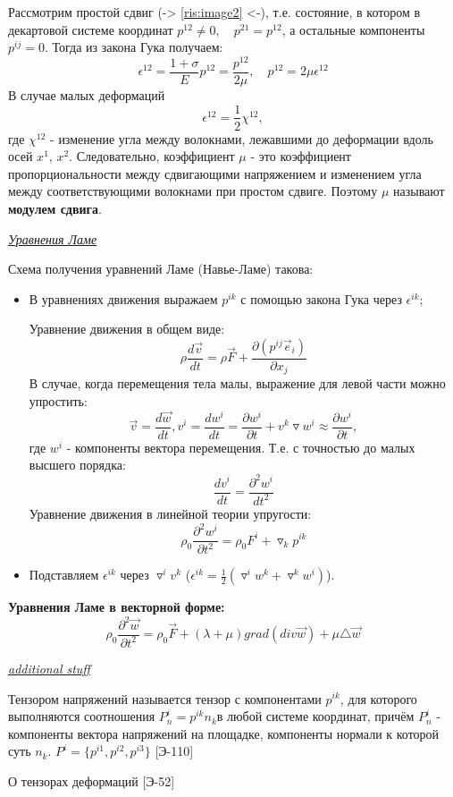 \quad Рассмотрим простой сдвиг (-> \ref{ris:image2} <-), т.е. состояние, в котором в декартовой системе координат $p^{12}\neq 0, \quad p^{21}=p^{12}$, а остальные компоненты $p^{ij}=0$. Тогда из закона Гука получаем: $$\epsilon^{12} = \frac{1+\sigma}{E}p^{12} = \frac{p^{12}}{2\mu}, \quad p^{12} = 2\mu \epsilon^{12}$$
В случае малых деформаций $$\epsilon^{12} = \frac{1}{2}\chi^{12},$$
где $\chi^{12}$ - изменение угла между волокнами, лежавшими до деформации вдоль осей $x^1$, $x^2$. Следовательно, коэффициент $\mu$ - это коэффициент пропорциональности между сдвигающими напряжением и изменением угла между соответствующими волокнами при простом сдвиге. Поэтому $\mu$ называют \textbf{модулем сдвига}. 

\begin{center}
	\textit{\underline{Уравнения Ламе}}
\end{center}
\quad Схема получения уравнений Ламе (Навье-Ламе) такова:
\begin{itemize}
\item В уравнениях движения выражаем $p^{ik}$ с помощью закона Гука через $\epsilon^{ik}$;

Уравнение движения в общем виде: $$\rho\frac{d\vec{v}}{dt} = \rho \vec{F} + \frac{\partial (p^{ij}\vec{e}_i)}{\partial x_j}$$
В случае, когда перемещения тела малы, выражение для левой части можно упростить: $$\vec{v} = \frac{d \vec{w}}{dt}, v^i = \frac{d w^i}{dt} = \frac{\partial w^i}{\partial t} + v^k \triangledown w^i \approx \frac{\partial w^i}{\partial t},$$
где $w^i$ - компоненты вектора перемещения. Т.е. с точностью до малых высшего порядка: $$\frac{d v^i}{dt} = \frac{\partial^2 w^i}{dt^2}$$
Уравнение движения в линейной теории упругости: $$\rho_0\frac{\partial^2 w^i}{\partial t^2} = \rho_0 F^i + \triangledown_k p^{ik}$$
\item Подставляем $\epsilon^{ik}$ через $\triangledown^i v^k$ ($\epsilon^{ik} = \frac{1}{2}(\triangledown^i w^k + \triangledown^k w^i)$).
\end{itemize}

\textbf{Уравнения Ламе в векторной форме:} $$\rho_0\frac{\partial^2 \vec{w}}{\partial t^2} = \rho_0\vec{F} + (\lambda + \mu)grad(div\vec{w}) + \mu \triangle \vec{w}$$

\begin{center}
	\textit{\underline{additional stuff}}
\end{center}
\begin{addition}
Тензором напряжений называется тензор с компонентами $p^{ik}$, для которого выполняются соотношения $P^i_n = p^{ik}n_k$в любой системе координат, причём $P^i_n$ - компоненты вектора напряжений на площадке, компоненты нормали к которой суть $n_k$. $P^i = \{p^{i1},p^{i2},p^{i3}\}$ [Э-110]
\end{addition}
\begin{addition}
О тензорах деформаций [Э-52]
\end{addition}
